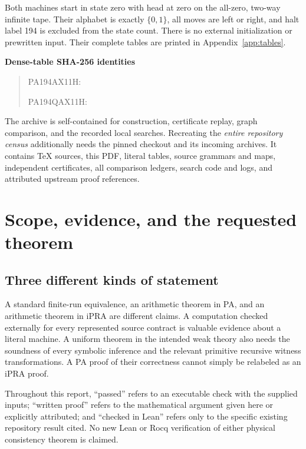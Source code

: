 \documentclass[11pt,a4paper]{article}
\begin{document}
Both machines start in state zero with head at zero on the all-zero,
two-way infinite tape. Their alphabet is exactly $\{0,1\}$, all moves
are left or right, and halt label 194 is excluded from the state count.
There is no external initialization or prewritten input.
Their complete tables are printed in Appendix~\ref{app:tables}.

\noindent\textbf{Dense-table SHA-256 identities}
\begin{quote}\small
PA194AX11H:\par
{}\par
PA194QAX11H:\par
{}
\end{quote}

The archive is self-contained for construction, certificate replay,
graph comparison, and the recorded local searches. Recreating the
\emph{entire repository census} additionally needs the pinned checkout
and its incoming archives. It contains TeX sources, this PDF, literal
tables, source grammars and maps, independent certificates, all comparison
ledgers, search code and logs, and attributed upstream proof references.

\clearpage
\tableofcontents
\clearpage

\section{Scope, evidence, and the requested theorem}

\subsection{Three different kinds of statement}

A standard finite-run equivalence, an arithmetic theorem in PA, and an
arithmetic theorem in iPRA are different claims. A computation checked
externally for every represented source contract is valuable evidence
about a literal machine. A uniform theorem in the intended weak theory
also needs the soundness of every symbolic inference and the relevant
primitive recursive witness transformations. A PA proof of their
correctness cannot simply be relabeled as an iPRA proof.

Throughout this report, ``passed'' refers to an executable check with
the supplied inputs; ``written proof'' refers to the mathematical argument
given here or explicitly attributed; and ``checked in Lean'' refers only
to the specific existing repository result cited. No new Lean or Rocq
verification of either physical consistency theorem is claimed.
\end{document}
